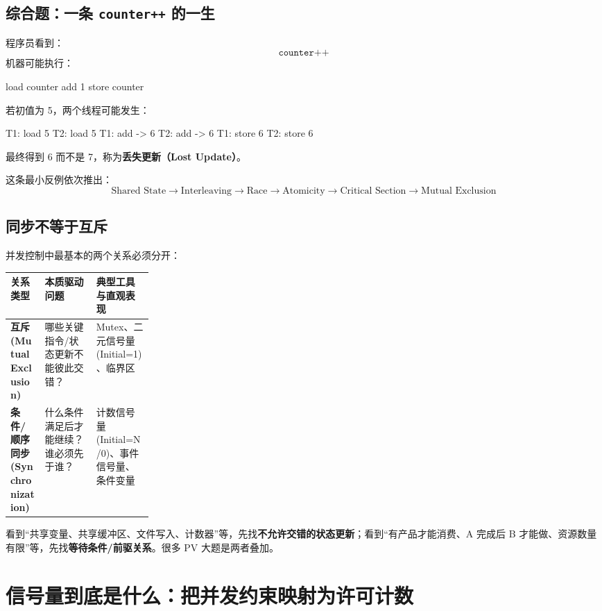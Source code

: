 \documentclass[11pt,a4paper]{ctexart}
\newcommand{\kw}[1]{\textbf{#1}}
\newcommand{\code}[1]{\texttt{#1}}
\begin{document}
\subsection{综合题：一条 \code{counter++} 的一生}

程序员看到：
\[
\texttt{counter++}
\]
机器可能执行：
\begin{codeblock}
load counter
add 1
store counter
\end{codeblock}
若初值为 5，两个线程可能发生：
\begin{codeblock}
T1: load 5
T2: load 5
T1: add  -> 6
T2: add  -> 6
T1: store 6
T2: store 6
\end{codeblock}
最终得到 6 而不是 7，称为\kw{丢失更新（Lost Update）}。

这条最小反例依次推出：
\[
\boxed{
\text{Shared State}
\to\text{Interleaving}
\to\text{Race}
\to\text{Atomicity}
\to\text{Critical Section}
\to\text{Mutual Exclusion}
}
\]

\subsection{同步不等于互斥}

并发控制中最基本的两个关系必须分开：

\begingroup
\small
\renewcommand{\arraystretch}{1.25}
\setlength{\tabcolsep}{6pt}
\begin{tabularx}{\linewidth}{>{\bfseries}p{0.24\linewidth} X X}
\toprule
关系类型 & 本质驱动问题 & 典型工具与直观表现\\
\midrule
互斥 (Mutual Exclusion) & 哪些关键指令/状态更新不能彼此交错？ & Mutex、二元信号量 (Initial=1)、临界区\\
条件/顺序同步 (Synchronization) & 什么条件满足后才能继续？谁必须先于谁？ & 计数信号量 (Initial=N/0)、事件信号量、条件变量\\
\bottomrule
\end{tabularx}
\endgroup

\begin{exam}[考试识别]
看到“共享变量、共享缓冲区、文件写入、计数器”等，先找\kw{不允许交错的状态更新}；看到“有产品才能消费、A 完成后 B 才能做、资源数量有限”等，先找\kw{等待条件/前驱关系}。很多 PV 大题是两者叠加。
\end{exam}

\section{信号量到底是什么：把并发约束映射为许可计数}
\end{document}
